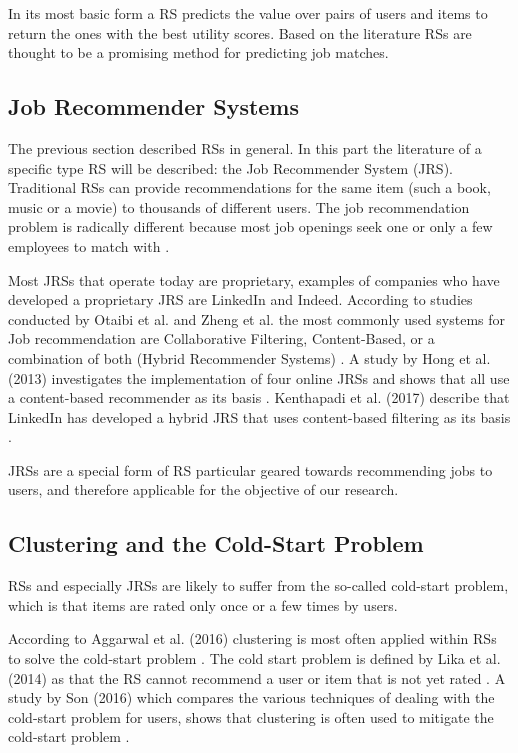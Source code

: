 In its most basic form a RS predicts the value over pairs of users and items to return the ones with the best utility scores.
Based on the literature RSs are thought to be a promising method for predicting job matches.

\subsection{Job Recommender Systems}
\label{sec:jrs}
The previous section described RSs in general. 
In this part the literature of a specific type RS will be described: the Job Recommender System (JRS).
Traditional RSs can provide recommendations for the same item (such a book, music or a movie) to thousands of different users.
The job recommendation problem is radically different because most job openings seek one or only a few employees to match with \cite{kenthapadi2017personalized}.

Most JRSs that operate today are proprietary, examples of companies who have developed a proprietary JRS are LinkedIn and Indeed.
According to studies conducted by Otaibi et al. and Zheng et al. the most commonly used  systems for Job recommendation are Collaborative Filtering, Content-Based, or a combination of both (Hybrid Recommender Systems) \cite{T.Al-Otaibi2012ASystems, Zheng2012JobSurvey}.
A study by Hong et al. (2013) investigates the implementation of four online JRSs and shows that all use a content-based recommender as its basis \cite{hong2013job}.
Kenthapadi et al. (2017) describe that LinkedIn has developed a hybrid JRS that uses content-based filtering as its basis \cite{kenthapadi2017personalized}.

JRSs are a special form of RS particular geared towards recommending jobs to users, and therefore applicable for the objective of our research. 

\subsection{Clustering and the Cold-Start Problem}
\label{sec:ccs}
RSs and especially JRSs are likely to suffer from the so-called cold-start problem, which is that items are rated only once or a few times by users.

According to Aggarwal et al. (2016) clustering is most often applied within RSs to solve the cold-start problem \cite{aggarwal2016recommender}.
The cold start problem is defined by Lika et al. (2014) as that the RS cannot recommend a user or item that is not yet rated \cite{lika2014facing}.
A study by Son (2016) which compares the various techniques of dealing with the cold-start problem for users, shows that clustering is often used to mitigate the cold-start problem \cite{son2016dealing}.

